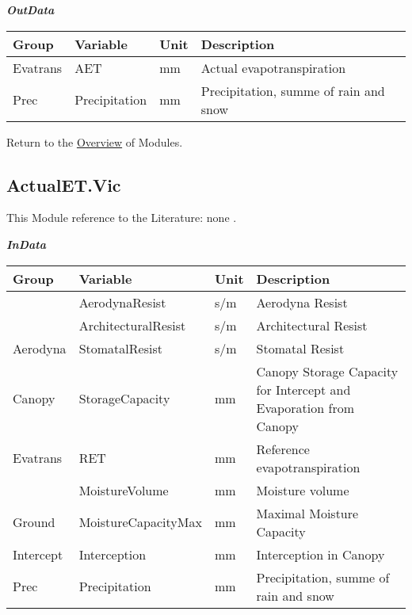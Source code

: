 \documentclass[
]{book}
\begin{document}
\textbf{\emph{OutData}}

\begin{table}[!h]
\centering
\begin{tabular}{l|l|l|l}
\hline
Group & Variable & Unit & Description\\
\hline
Evatrans & AET & mm & Actual evapotranspiration\\
\cline{1-4}
Prec & Precipitation & mm & Precipitation, summe of rain and snow\\
\hline
\end{tabular}
\end{table}

Return to the \protect\hyperlink{module}{Overview} of Modules.

\hypertarget{ActualET.Vic}{%
\subsection{ActualET.Vic}\label{ActualET.Vic}}

This Module reference to the Literature: none \citep{none}.

\textbf{\emph{InData}}

\begin{table}[!h]
\centering
\begin{tabular}{l|l|l|l}
\hline
Group & Variable & Unit & Description\\
\hline
 & AerodynaResist & s/m & Aerodyna Resist\\
\cline{2-4}
 & ArchitecturalResist & s/m & Architectural Resist\\
\cline{2-4}
\multirow{-3}{*}{\raggedright\arraybackslash Aerodyna} & StomatalResist & s/m & Stomatal Resist\\
\cline{1-4}
Canopy & StorageCapacity & mm & Canopy Storage Capacity for Intercept and Evaporation from Canopy\\
\cline{1-4}
Evatrans & RET & mm & Reference evapotranspiration\\
\cline{1-4}
 & MoistureVolume & mm & Moisture volume\\
\cline{2-4}
\multirow{-2}{*}{\raggedright\arraybackslash Ground} & MoistureCapacityMax & mm & Maximal Moisture Capacity\\
\cline{1-4}
Intercept & Interception & mm & Interception in Canopy\\
\cline{1-4}
Prec & Precipitation & mm & Precipitation, summe of rain and snow\\
\hline
\end{tabular}
\end{table}
\end{document}
